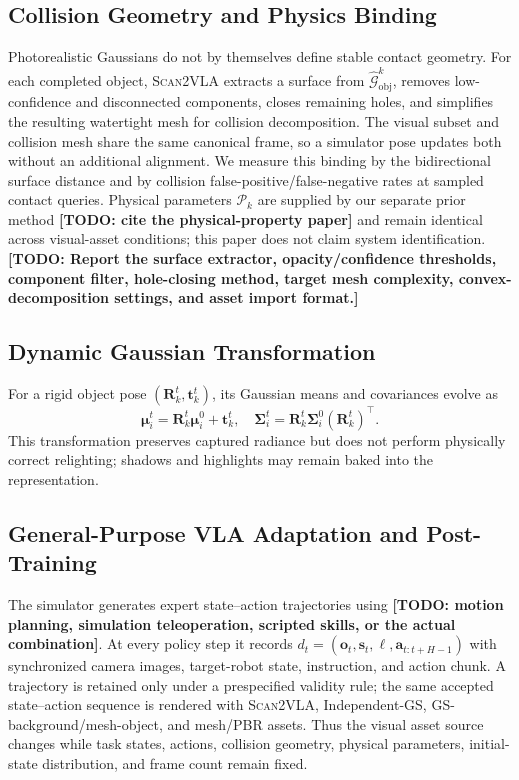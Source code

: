 \documentclass[letterpaper,10pt,conference]{ieeeconf}
\newcommand{\system}{\textsc{Scan2VLA}}
\newcommand{\todo}[1]{\textbf{[TODO: #1]}}
\begin{document}
\subsection{Collision Geometry and Physics Binding}
Photorealistic Gaussians do not by themselves define stable contact geometry.
For each completed object, \system{} extracts a surface from
$\widehat{\mathcal{G}}_{\mathrm{obj}}^k$, removes low-confidence and disconnected
components, closes remaining holes, and simplifies the resulting watertight mesh
for collision decomposition. The visual subset and collision mesh share the
same canonical frame, so a simulator pose updates both without an additional
alignment. We measure this binding by the bidirectional surface distance and by
collision false-positive/false-negative rates at sampled contact queries.
Physical parameters $\mathcal{P}_k$ are supplied by our separate prior method
\todo{cite the physical-property paper} and remain identical across visual-asset
conditions; this paper does not claim system identification. \todo{Report the
surface extractor, opacity/confidence thresholds, component filter, hole-closing
method, target mesh complexity, convex-decomposition settings, and asset import
format.}

\subsection{Dynamic Gaussian Transformation}
For a rigid object pose $(\mathbf{R}_k^t,\mathbf{t}_k^t)$, its Gaussian means
and covariances evolve as
\begin{equation}
  \boldsymbol{\mu}_i^t = \mathbf{R}_k^t\boldsymbol{\mu}_i^0
  + \mathbf{t}_k^t, \quad
  \boldsymbol{\Sigma}_i^t = \mathbf{R}_k^t
  \boldsymbol{\Sigma}_i^0(\mathbf{R}_k^t)^\top.
  \label{eq:rigid-transform}
\end{equation}
This transformation preserves captured radiance but does not perform
physically correct relighting; shadows and highlights may remain baked into the
representation.

\subsection{General-Purpose VLA Adaptation and Post-Training}
The simulator generates expert state--action trajectories using \todo{motion
planning, simulation teleoperation, scripted skills, or the actual combination}.
At every policy step it records
$d_t=(\mathbf{o}_t,\mathbf{s}_t,\ell,
\mathbf{a}_{t:t+H-1})$ with synchronized camera images, target-robot state,
instruction,
and action chunk. A trajectory is retained only under a prespecified validity
rule; the same accepted state--action sequence is rendered with \system{},
Independent-GS, GS-background/mesh-object, and mesh/PBR assets. Thus the visual
asset source changes while task states, actions, collision geometry, physical
parameters, initial-state distribution, and frame count remain fixed.
\end{document}
